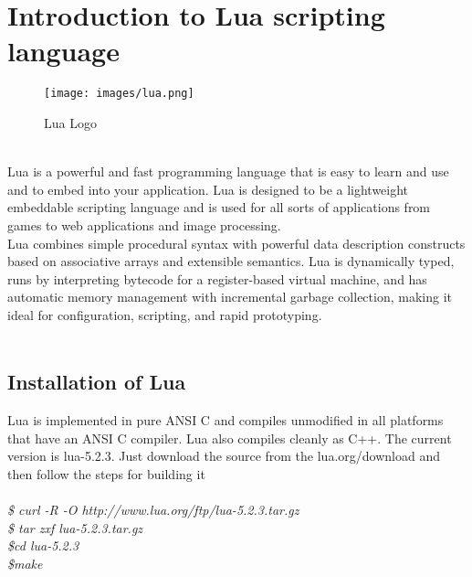 \section{Introduction to Lua scripting language}
\begin{figure}[!ht]
\centering
\texttt{[image: images/lua.png]} 
\vspace{-0.5em}
\caption{Lua Logo}
\hspace{-1.5em}
\end{figure}
\leavevmode\\
Lua is a powerful and fast programming language that is easy to learn and use and to embed into your application. Lua is designed to be a lightweight embeddable scripting language and is used for all sorts of applications from games to web applications and image processing.\\

Lua combines simple procedural syntax with powerful data description constructs based on associative arrays and extensible semantics. Lua is dynamically typed, runs by interpreting bytecode for a register-based virtual machine, and has automatic memory management with incremental garbage collection, making it ideal for configuration, scripting, and rapid prototyping.\\\\

\subsection{Installation of Lua}
Lua is implemented in pure ANSI C and compiles unmodified in all platforms that have an ANSI C compiler. Lua also compiles cleanly as C++. The current version is lua-5.2.3. Just download the source from the lua.org/download and then follow the steps for building it\\\\
\textit
{\$ curl -R -O http://www.lua.org/ftp/lua-5.2.3.tar.gz\\
\$ tar zxf lua-5.2.3.tar.gz\\
\$cd lua-5.2.3\\
\$make
}

\leavevmode

